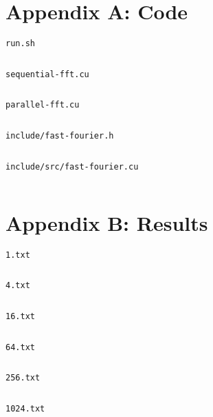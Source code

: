 \documentclass[notitlepage]{article}
\begin{document}
\section*{Appendix A: Code}

\verb|run.sh|
\inputminted[tabsize=4, fontsize=\scriptsize]{sh}{../fast-fourier/run.sh}

\pagebreak

\verb|sequential-fft.cu|
\inputminted[tabsize=4, fontsize=\scriptsize]{cu}{../fast-fourier/sequential-fft.cu}

\pagebreak

\verb|parallel-fft.cu|
\inputminted[tabsize=4, fontsize=\scriptsize]{cu}{../fast-fourier/parallel-fft.cu}

\pagebreak

\verb|include/fast-fourier.h|
\inputminted[tabsize=4, fontsize=\scriptsize]{cu}{../fast-fourier/include/fast-fourier.h}

\pagebreak

\verb|include/src/fast-fourier.cu|
\inputminted[tabsize=4, fontsize=\scriptsize]{cu}{../fast-fourier/include/src/fast-fourier.cu}

\pagebreak

\section*{Appendix B: Results}

\verb|1.txt|
\inputminted[tabsize=4, fontsize=\scriptsize]{sh}{results/1.txt}

\noindent\verb|4.txt|
\inputminted[tabsize=4, fontsize=\scriptsize]{sh}{results/4.txt}

\noindent\verb|16.txt|
\inputminted[tabsize=4, fontsize=\scriptsize]{sh}{results/16.txt}

\noindent\verb|64.txt|
\inputminted[tabsize=4, fontsize=\scriptsize]{sh}{results/64.txt}

\noindent\verb|256.txt|
\inputminted[tabsize=4, fontsize=\scriptsize]{sh}{results/256.txt}

\noindent\verb|1024.txt|
\inputminted[tabsize=4, fontsize=\scriptsize]{sh}{results/1024.txt}
\end{document}
